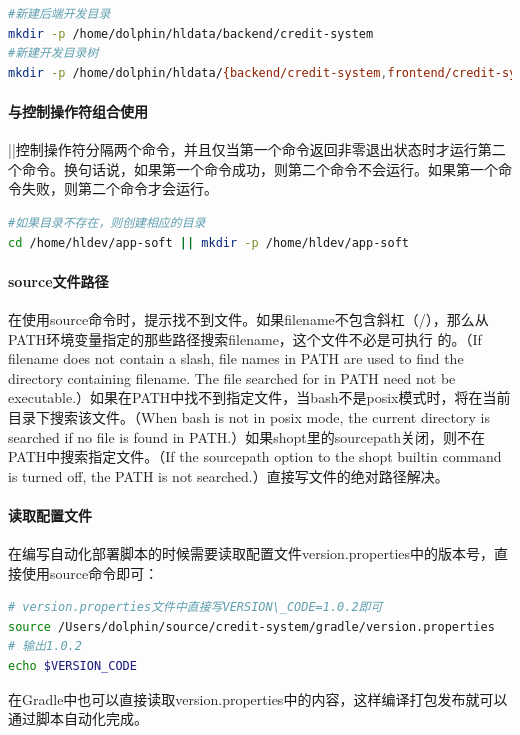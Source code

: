 \documentclass[letter]{book}
\begin{document}
\begin{lstlisting}[language=Bash]
#新建后端开发目录
mkdir -p /home/dolphin/hldata/backend/credit-system
#新建开发目录树
mkdir -p /home/dolphin/hldata/{backend/credit-system,frontend/credit-system-frontend,doc/{html,info,pdf},demo/}
\end{lstlisting}

\paragraph{与控制操作符组合使用}||控制操作符分隔两个命令，并且仅当第一个命令返回非零退出状态时才运行第二个命令。换句话说，如果第一个命令成功，则第二个命令不会运行。如果第一个命令失败，则第二个命令才会运行。

\begin{lstlisting}[language=Bash]
#如果目录不存在，则创建相应的目录
cd /home/hldev/app-soft || mkdir -p /home/hldev/app-soft
\end{lstlisting}

\paragraph{source文件路径}在使用source命令时，提示找不到文件。如果filename不包含斜杠（/），那么从PATH环境变量指定的那些路径搜索filename，这个文件不必是可执行 的。（If filename does not contain a slash, file names in  PATH  are used  to  find the directory containing filename.  The file searched for in PATH need not be executable.）如果在PATH中找不到指定文件，当bash不是posix模式时，将在当前目录下搜索该文件。（When bash is not in posix mode, the current directory is searched if no file is found in PATH.）如果shopt里的sourcepath关闭，则不在PATH中搜索指定文件。（If  the sourcepath  option  to  the shopt builtin command is turned off, the PATH is not searched.）直接写文件的绝对路径解决。

\paragraph{读取配置文件}在编写自动化部署脚本的时候需要读取配置文件version.properties中的版本号，直接使用source命令即可：

\begin{lstlisting}[language=Bash]
# version.properties文件中直接写VERSION\_CODE=1.0.2即可
source /Users/dolphin/source/credit-system/gradle/version.properties
# 输出1.0.2
echo $VERSION_CODE
\end{lstlisting}

在Gradle中也可以直接读取version.properties中的内容，这样编译打包发布就可以通过脚本自动化完成。
\end{document}
